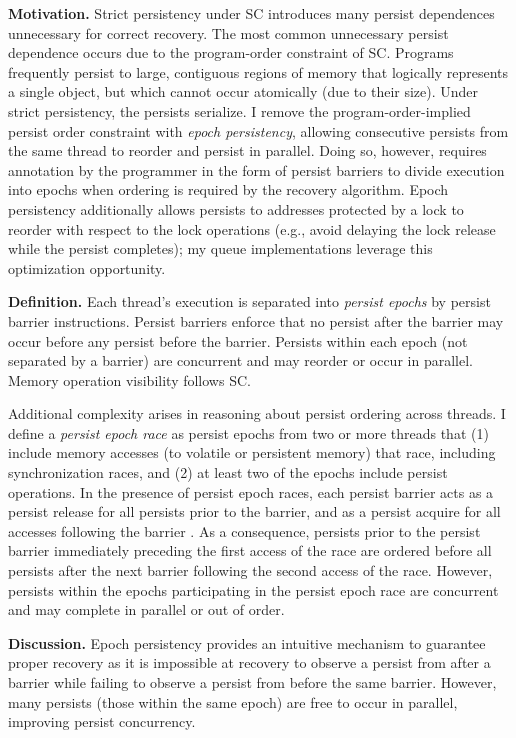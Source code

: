 \textbf{Motivation.}
Strict persistency under SC introduces many persist dependences unnecessary for correct recovery.
The most common unnecessary persist dependence occurs due to the program-order constraint of SC.
Programs frequently persist to large, contiguous regions of memory that logically represents a single object, but which cannot occur atomically (due to their size).
Under strict persistency, the persists serialize.
I remove the program-order-implied persist order constraint with \emph{epoch persistency}, allowing consecutive persists from the same thread to reorder and persist in parallel.
Doing so, however, requires annotation by the programmer in the form of persist barriers to divide execution into epochs when ordering is required by the recovery algorithm.
Epoch persistency additionally allows persists to addresses protected by a lock to reorder with respect to the lock operations (e.g., avoid delaying the lock release while the persist completes); my queue implementations leverage this optimization opportunity.

\textbf{Definition.}
Each thread's execution is separated into \emph{persist epochs} by persist barrier instructions.
Persist barriers enforce that no persist after the barrier may occur before any persist before the barrier.
Persists within each epoch (not separated by a barrier) are concurrent and may reorder or occur in parallel.
Memory operation visibility follows SC.

Additional complexity arises in reasoning about persist ordering across threads. 
I define a \emph{persist epoch race} as persist epochs from two or more threads that (1) include memory accesses (to volatile or persistent memory) that race, including synchronization races, and (2) at least two of the epochs include persist operations. 
In the presence of persist epoch races, each persist barrier acts as a persist release for all persists prior to the barrier, and as a persist acquire for all accesses following the barrier \cite{GharachorlooLenoski90}.
As a consequence, persists prior to the persist barrier immediately preceding the first access of the race are ordered before all persists after the next barrier following the second access of the race.
However, persists within the epochs participating in the persist epoch race are concurrent and may complete in parallel or out of order.

\textbf{Discussion.}
Epoch persistency provides an intuitive mechanism to guarantee proper recovery as it is impossible at recovery to observe a persist from after a barrier while failing to observe a persist from before the same barrier.
However, many persists (those within the same epoch) are free to occur in parallel, improving persist concurrency.

